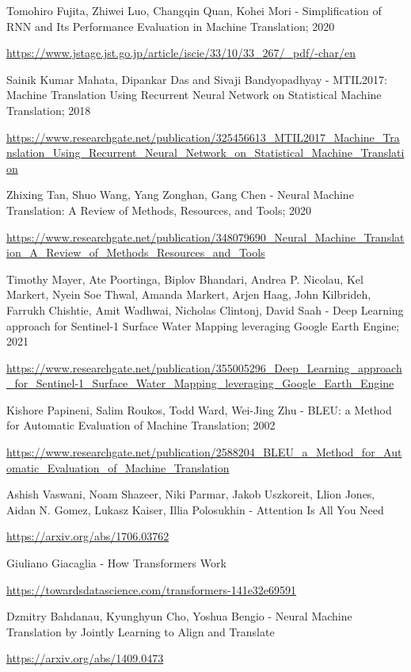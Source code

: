 \begin{thebibliography}{}
		 Tomohiro Fujita, Zhiwei Luo, Changqin Quan, Kohei Mori - Simplification of RNN and Its Performance Evaluation in Machine Translation; 2020
		
		\url{https://www.jstage.jst.go.jp/article/iscie/33/10/33_267/_pdf/-char/en}
		
		 Sainik Kumar Mahata, Dipankar Das and Sivaji Bandyopadhyay -  MTIL2017: Machine Translation Using Recurrent Neural Network on Statistical Machine Translation; 2018
		
		\url{https://www.researchgate.net/publication/325456613_MTIL2017_Machine_Translation_Using_Recurrent_Neural_Network_on_Statistical_Machine_Translation}
		
		 Zhixing Tan, Shuo Wang, Yang Zonghan, Gang Chen - Neural Machine Translation: A Review of Methods, Resources, and Tools; 2020
		
		\url{https://www.researchgate.net/publication/348079690_Neural_Machine_Translation_A_Review_of_Methods_Resources_and_Tools}
		
		 Timothy Mayer, Ate Poortinga, Biplov Bhandari, Andrea P. Nicolau, Kel Markert, Nyein Soe Thwal, Amanda Markert, Arjen Haag, John Kilbrideh, Farrukh Chishtie, Amit Wadhwai, Nicholas Clintonj, David Saah - Deep Learning approach for Sentinel-1 Surface Water Mapping leveraging Google Earth Engine; 2021
		
		\url{https://www.researchgate.net/publication/355005296_Deep_Learning_approach_for_Sentinel-1_Surface_Water_Mapping_leveraging_Google_Earth_Engine}
		
		 Kishore Papineni, Salim Roukos, Todd Ward, Wei-Jing Zhu - BLEU: a Method for Automatic Evaluation of Machine Translation; 2002
		
		\url{https://www.researchgate.net/publication/2588204_BLEU_a_Method_for_Automatic_Evaluation_of_Machine_Translation}
		
		 Ashish Vaswani, Noam Shazeer, Niki Parmar, Jakob Uszkoreit, Llion Jones, Aidan N. Gomez, Lukasz Kaiser, Illia Polosukhin - Attention Is All You Need
		
		\url{https://arxiv.org/abs/1706.03762}
		
		 Giuliano Giacaglia - How Transformers Work
		
		\url{https://towardsdatascience.com/transformers-141e32e69591}
		
		 Dzmitry Bahdanau, Kyunghyun Cho, Yoshua Bengio - Neural Machine Translation by Jointly Learning to Align and Translate
		
		\url{https://arxiv.org/abs/1409.0473}
	\end{thebibliography}




